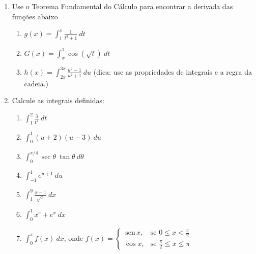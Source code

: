 \documentclass[a4paper,5pt]{amsbook}
\newcommand{\sen}{\,\mbox{sen}\,}
\newcommand{\ds}{\displaystyle}
\begin{document}
\begin{enumerate}
    \vspace{0.5cm}
    \item Use o Teorema Fundamental do C\'alculo para encontrar a derivada das
    	fun\c{c}\~oes abaixo
    \begin{enumerate}
    	\item $\displaystyle g(x) = \int_1^x \frac{1}{t^3 + 1}\ dt$
    	\item $\displaystyle G(x) = \int_x^1 \cos(\sqrt{t})\ dt$
        \item $\displaystyle h(x) = \int_{2x}^{3x} \frac{u^2 - 1}{u^2 + 1}\ du$
            (dica: use as propriedades de integrais e a regra da cadeia.)
    \end{enumerate}

    \vspace{0.5cm}
    \item Calcule as integrais definidas:
    \begin{enumerate}
    	\item $\displaystyle\int_1^2 \frac{3}{t^4}\ dt$
        \vspace{0.3cm}
        \item $\ds\int_0^1 (u+2)(u-3)\ du$
        \vspace{0.3cm}
    	\item $\displaystyle\int_0^{\pi/4} \sec\theta\ \tan\theta\ d\theta$
        \vspace{0.3cm}
    	\item $\displaystyle\int_{-1}^1 e^{u+1}\ du$
        \vspace{0.3cm}
        \item $\ds\int_1^9 \frac{x-1}{\sqrt{x}}\ dx$
        \vspace{0.3cm}
    	\item $\displaystyle\int_0^1 x^e + e^x\ dx$
        \vspace{0.3cm}
    	\item $\displaystyle\int_0^{\pi} f(x)\ dx$, onde $f(x) = \left\{
    			\begin{array}{rl}
    				\sen x, & \mbox{se } 0 \le x < \frac{\pi}{2} \\
    				\cos x, & \mbox{se } \frac{\pi}{2} \le x \le \pi
    			\end{array}\right.$
    \end{enumerate}


\end{enumerate}
\end{document}
